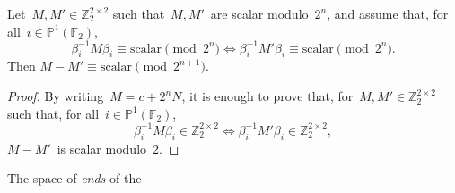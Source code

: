 \documentclass{article}
\def\scalar{\mathrm{scalar}}
\def\F{\mathbb{F}}
\def\smat{\def\arraystretch{.6}\mat}
\begin{document}
\begin{lem}
Let~$M, M' ∈ ℤ_{2}^{2×2}$ such that~$M, M'$~are scalar
modulo~$2^n$, and assume that, for all~$i ∈ ℙ^1(\F_{2})$,
\[ β_i^{-1} M β_i ≡ \scalar \pmod{2^{n}} ⇔ 
β_i^{-1} M' β_i ≡ \scalar \pmod{2^{n}}. \]
Then $M - M' ≡ \scalar \pmod{2^{n+1}}$.
\end{lem}

\begin{proof}
By writing~$M = c + 2^n N$, it is enough to prove that, for~$M, M' ∈
ℤ_{2}^{2×2}$ such that, for all~$i ∈ ℙ^1(\F_{2})$,
\[ β_i^{-1} M β_i ∈ ℤ_{2}^{2×2} ⇔ β_i^{-1} M' β_i ∈ ℤ_{2}^{2×2}, \]
$M - M'$~is scalar modulo~$2$.
\end{proof}

\bigskip

The space of \emph{ends} of the

% 
\end{document}
